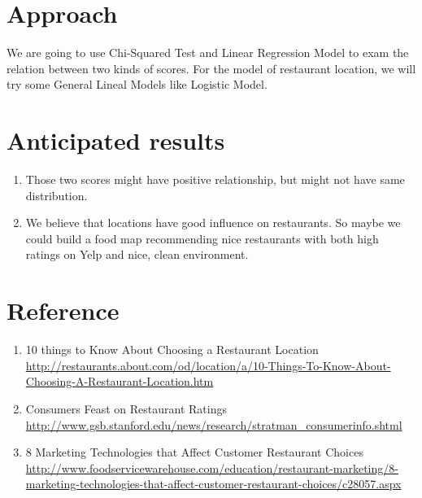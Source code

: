 \documentclass{article}
\begin{document}
\section{Approach}
We are going to use Chi-Squared Test and Linear Regression Model to exam the relation between two kinds of scores. For the model of restaurant location, we will try some General Lineal Models like Logistic Model.

\section{Anticipated results}
\begin{enumerate}
  \item Those two scores might have positive relationship, but might not have same distribution.
  \item We believe that locations have good influence on restaurants. So maybe we could build a food map recommending nice restaurants with both high ratings on Yelp and nice, clean environment. 

\end{enumerate}



\section{Reference}
\begin{enumerate}
  \item10 things to Know About Choosing a Restaurant Location \url{http://restaurants.about.com/od/location/a/10-Things-To-Know-About-Choosing-A-Restaurant-Location.htm}
  \item Consumers Feast on Restaurant Ratings \url{http://www.gsb.stanford.edu/news/research/stratman_consumerinfo.shtml}
  \item 8 Marketing Technologies that Affect Customer Restaurant Choices \url{http://www.foodservicewarehouse.com/education/restaurant-marketing/8-marketing-technologies-that-affect-customer-restaurant-choices/c28057.aspx}
\end{enumerate}
\end{document}

